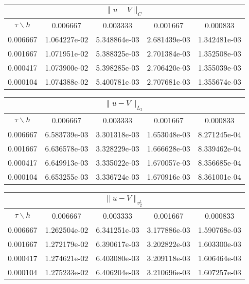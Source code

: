 \documentclass[a4paper,12pt]{article}
\begin{document}
\begin{center}
\begin{tabular}{|c|c|c|c|c|}
\hline
\multicolumn{5}{|c|}{$\|u - V \| _{C}$}\\ 
\hline
$\tau \backslash h$ & 0.006667 & 0.003333 & 0.001667 & 0.000833 \\ 
\hline
0.006667 & 1.064227e-02 & 5.348864e-03 & 2.681439e-03 & 1.342481e-03 \\ 
\hline
0.001667 & 1.071951e-02 & 5.388325e-03 & 2.701384e-03 & 1.352508e-03 \\ 
\hline
0.000417 & 1.073900e-02 & 5.398285e-03 & 2.706420e-03 & 1.355039e-03 \\ 
\hline
0.000104 & 1.074388e-02 & 5.400781e-03 & 2.707681e-03 & 1.355674e-03 \\ 
\hline
\end{tabular}
\end{center}
\begin{center}
\begin{tabular}{|c|c|c|c|c|}
\hline
\multicolumn{5}{|c|}{$\|u - V \| _{L_2}$}\\ 
\hline
$\tau \backslash h$ & 0.006667 & 0.003333 & 0.001667 & 0.000833 \\ 
\hline
0.006667 & 6.583739e-03 & 3.301318e-03 & 1.653048e-03 & 8.271245e-04 \\ 
\hline
0.001667 & 6.636578e-03 & 3.328229e-03 & 1.666628e-03 & 8.339462e-04 \\ 
\hline
0.000417 & 6.649913e-03 & 3.335022e-03 & 1.670057e-03 & 8.356685e-04 \\ 
\hline
0.000104 & 6.653255e-03 & 3.336724e-03 & 1.670916e-03 & 8.361001e-04 \\ 
\hline
\end{tabular}
\end{center}
\begin{center}
\begin{tabular}{|c|c|c|c|c|}
\hline
\multicolumn{5}{|c|}{$\|u - V \| _{v_2^1}$}\\ 
\hline
$\tau \backslash h$ & 0.006667 & 0.003333 & 0.001667 & 0.000833 \\ 
\hline
0.006667 & 1.262504e-02 & 6.341251e-03 & 3.177886e-03 & 1.590768e-03 \\ 
\hline
0.001667 & 1.272179e-02 & 6.390617e-03 & 3.202822e-03 & 1.603300e-03 \\ 
\hline
0.000417 & 1.274621e-02 & 6.403080e-03 & 3.209118e-03 & 1.606464e-03 \\ 
\hline
0.000104 & 1.275233e-02 & 6.406204e-03 & 3.210696e-03 & 1.607257e-03 \\ 
\hline
\end{tabular}
\end{center}
\end{document}
